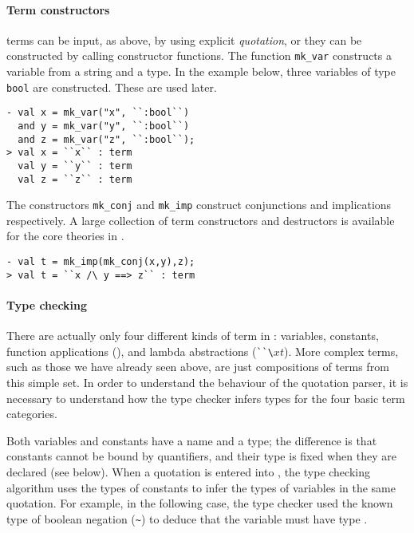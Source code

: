 \paragraph{Term constructors}
\HOL{} terms can be input, as above, by using explicit \emph{quotation}, or they can be constructed by calling \ML{} constructor functions.
The function {\small\verb|mk_var|} constructs a variable from a string and a type.
In the example below, three variables of type {\small\verb|bool|} are constructed.
These are used later.

\begin{session}
\begin{verbatim}
- val x = mk_var("x", ``:bool``)
  and y = mk_var("y", ``:bool``)
  and z = mk_var("z", ``:bool``);
> val x = ``x`` : term
  val y = ``y`` : term
  val z = ``z`` : term
\end{verbatim}
\end{session}

The constructors {\small\verb|mk_conj|} and {\small\verb|mk_imp|} construct conjunctions and implications respectively.
A large collection of term constructors and destructors is available for the core theories in \HOL.

\begin{session}
\begin{verbatim}
- val t = mk_imp(mk_conj(x,y),z);
> val t = ``x /\ y ==> z`` : term
\end{verbatim}
\end{session}

\paragraph{Type checking}

There are actually only four different kinds of term in \HOL: variables, constants, function applications (), and lambda abstractions ({\small\verb|``\|}$x$$t$).
More complex terms, such as those we have already seen above, are just compositions of terms from this simple set.
In order to understand the behaviour of the quotation parser, it is necessary to understand how the type checker infers types for the four basic term categories.

Both variables and constants have a name and a type; the difference is that constants cannot be bound by quantifiers, and their type is fixed when they are declared (see below).
When a quotation is entered into \HOL{}, the type checking algorithm uses the types of constants to infer the types of variables in the same quotation.
For example, in the following case, the \HOL{} type checker used the known type  of boolean negation ({\small\verb|~|}) to deduce that the variable  must have type .

